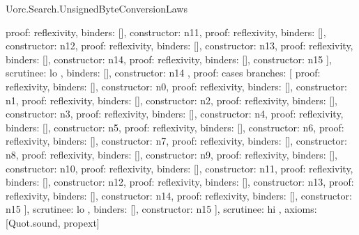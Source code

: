 \begin{lexlean}{Uorc.Search.UnsignedByteConversionLaws}
\begin{semanticmodule}
{{{{            {proof: reflexivity{}, binders: [], constructor: n11},
            {proof: reflexivity{}, binders: [], constructor: n12},
            {proof: reflexivity{}, binders: [], constructor: n13},
            {proof: reflexivity{}, binders: [], constructor: n14},
            {proof: reflexivity{}, binders: [], constructor: n15}
          ],
          scrutinee: lo
        },
        binders: [],
        constructor: n14
      },
      {
        proof: cases{
          branches: [
            {proof: reflexivity{}, binders: [], constructor: n0},
            {proof: reflexivity{}, binders: [], constructor: n1},
            {proof: reflexivity{}, binders: [], constructor: n2},
            {proof: reflexivity{}, binders: [], constructor: n3},
            {proof: reflexivity{}, binders: [], constructor: n4},
            {proof: reflexivity{}, binders: [], constructor: n5},
            {proof: reflexivity{}, binders: [], constructor: n6},
            {proof: reflexivity{}, binders: [], constructor: n7},
            {proof: reflexivity{}, binders: [], constructor: n8},
            {proof: reflexivity{}, binders: [], constructor: n9},
            {proof: reflexivity{}, binders: [], constructor: n10},
            {proof: reflexivity{}, binders: [], constructor: n11},
            {proof: reflexivity{}, binders: [], constructor: n12},
            {proof: reflexivity{}, binders: [], constructor: n13},
            {proof: reflexivity{}, binders: [], constructor: n14},
            {proof: reflexivity{}, binders: [], constructor: n15}
          ],
          scrutinee: lo
        },
        binders: [],
        constructor: n15
      }
    ],
    scrutinee: hi
  },
  axioms: [Quot.sound, propext]
}


\end{semanticmodule}
\end{lexlean}
